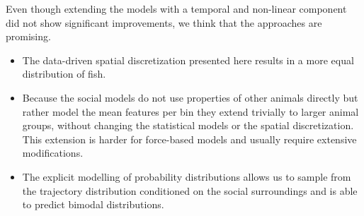 \documentclass[nobib]{tufte-handout}
\begin{document}
Even though extending the models with a temporal and non-linear component did not show significant improvements, we think that the approaches are promising.
\begin{itemize}
\item The data-driven spatial discretization presented here results in a more equal distribution of fish.
\item Because the social models do not use properties of other animals directly but rather model the mean features per bin they extend trivially to larger animal groups, without changing the statistical models or the spatial discretization.
  This extension is harder for force-based models and usually require extensive modifications.
\item The explicit modelling of probability distributions allows us to sample from the trajectory distribution conditioned on the social surroundings and is able to predict bimodal distributions.
\end{itemize}

\printbibliography
\end{document}
